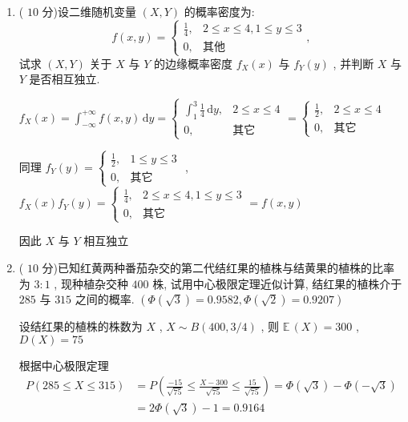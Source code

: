 \documentclass[cn,11pt,fancy,hide]{elegantbook}
\newcommand{\dd}{\,\mathrm{d}}
\newcommand{\EE}{\mathbb{E}\,}
\renewcommand{\leq}{\leqslant}
\begin{document}
\begin{enumerate}
	\item ( $10$ 分)设二维随机变量 $(X,Y)$ 的概率密度为:
	\begin{equation*}
	f(x,y)=
	\begin{cases}
	\frac{1}{4}, & 2\leq x\leq4,1\leq y\leq3\\
	0, & \text{其他}
	\end{cases},
	\end{equation*}
	试求 $(X,Y)$ 关于 $X$ 与 $Y$ 的边缘概率密度 $f_X(x)$ 与 $f_Y(y)$ , 并判断 $X$ 与 $Y$ 是否相互独立.
	\begin{solution}
		$f_X(x)=\int_{-\infty}^{+\infty}f(x,y)\dd y=
		\begin{cases}
		\int_{1}^{3}\frac{1}{4}\dd y, & 2\leq x\leq4\\
		0, & \text{其它}
		\end{cases}=\begin{cases}
		\frac{1}{2}, & 2\leq x\leq4\\
		0, & \text{其它}
		\end{cases}
		$
		
		同理 $f_Y(y)=
		\begin{cases}
		\frac{1}{2}, & 1\leq y\leq3\\
		0, & \text{其它}
		\end{cases}
		$ , $f_X(x)f_Y(y)=
		\begin{cases}
		\frac{1}{4}, & 2\leq x\leq4,1\leq y\leq 3\\
		0, & \text{其它}
		\end{cases}=f(x,y)
		$
		
		因此 $X$ 与 $Y$ 相互独立
	\end{solution}
	
	\item ( $10$ 分)已知红黄两种番茄杂交的第二代结红果的植株与结黄果的植株的比率为 $3:1$ , 现种植杂交种 $400$ 株, 试用中心极限定理近似计算, 结红果的植株介于 $285$ 与 $315$ 之间的概率. $\left(\varPhi\left(\sqrt{3}\right)=0.9582,\varPhi\left(\sqrt{2}\right)=0.9207\right)$
	\begin{solution}
		设结红果的植株的株数为 $X$ , $X\sim B(400,3/4)$ , 则 $\EE(X)=300$ , $D(X)=75$
		
		根据中心极限定理
			\begin{align*}
			 P(285\leq X\leq 315)&=P\left(\frac{-15}{\sqrt{75}}\leq\frac{X-300}{\sqrt{75}}\leq\frac{15}{\sqrt{75}}\right)=\varPhi\left(\sqrt{3}\right)-\varPhi\left(-\sqrt{3}\right)\\
			&=2\varPhi\left(\sqrt{3}\right)-1=0.9164
			\end{align*}
	\end{solution}
	

\end{enumerate}
\end{document}
